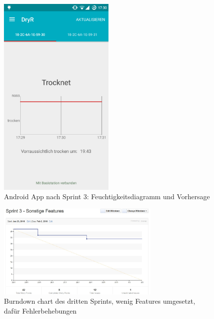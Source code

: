 						\begin{figure}[htb] 
							\centerline{\includegraphics[width=0.5\textwidth]{laundry_status_diagram_forecast.png}}
							\caption{Android App nach Sprint 3: Feuchtigkeitsdiagramm und Vorhersage}
							\label{screenshot_sprint_3_laundry_status}
						\end{figure}
\begin{figure}[htb] 
	\centerline{\includegraphics[width=0.7\textwidth]{burndown_sprint3.jpg}}
	\caption{Burndown chart des dritten Sprints, wenig Features umgesetzt, dafür Fehlerbehebungen}
	\label{screenshot_sprint_3_burndown}
\end{figure}
